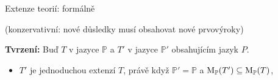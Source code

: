 \documentclass{beamer}
\begin{document}
\begin{frame}{Extenze teorií: formálně}


\vspace{-6pt}
(konzervativní: nové důsledky musí obsahovat nové prvovýroky)

\textbf{Tvrzení:} Buď $T$ v jazyce $\mathbb P$ a $T'$ v jazyce $\mathbb P'$ obsahujícím jazyk $P$.
\begin{itemize}
\item $T'$ je jednoduchou extenzí $T$, právě když $\mathbb P'=\mathbb P$ a $\operatorname{M}_\mathbb P(T')\subseteq\operatorname{M}_\mathbb P(T)$,
\end{itemize}

\end{frame}    
\end{document}
